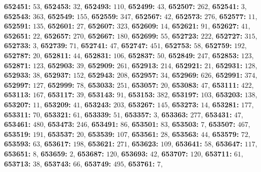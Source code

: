 \textsf{\bfseries 652451:} $53$, \textsf{\bfseries 652453:} $32$, \textsf{\bfseries 652493:} $110$, \textsf{\bfseries 652499:} $43$, \textsf{\bfseries 652507:} $262$, \textsf{\bfseries 652541:} $3$, \textsf{\bfseries 652543:} $363$, \textsf{\bfseries 652549:} $155$, \textsf{\bfseries 652559:} $347$, \textsf{\bfseries 652567:} $42$, \textsf{\bfseries 652573:} $276$, \textsf{\bfseries 652577:} $11$, \textsf{\bfseries 652591:} $135$, \textsf{\bfseries 652601:} $27$, \textsf{\bfseries 652607:} $323$, \textsf{\bfseries 652609:} $14$, \textsf{\bfseries 652621:} $91$, \textsf{\bfseries 652627:} $41$, \textsf{\bfseries 652651:} $22$, \textsf{\bfseries 652657:} $270$, \textsf{\bfseries 652667:} $180$, \textsf{\bfseries 652699:} $55$, \textsf{\bfseries 652723:} $222$, \textsf{\bfseries 652727:} $315$, \textsf{\bfseries 652733:} $3$, \textsf{\bfseries 652739:} $71$, \textsf{\bfseries 652741:} $47$, \textsf{\bfseries 652747:} $451$, \textsf{\bfseries 652753:} $58$, \textsf{\bfseries 652759:} $192$, \textsf{\bfseries 652787:} $20$, \textsf{\bfseries 652811:} $44$, \textsf{\bfseries 652831:} $106$, \textsf{\bfseries 652837:} $50$, \textsf{\bfseries 652849:} $247$, \textsf{\bfseries 652853:} $123$, \textsf{\bfseries 652871:} $123$, \textsf{\bfseries 652903:} $39$, \textsf{\bfseries 652909:} $261$, \textsf{\bfseries 652913:} $214$, \textsf{\bfseries 652921:} $21$, \textsf{\bfseries 652931:} $128$, \textsf{\bfseries 652933:} $38$, \textsf{\bfseries 652937:} $152$, \textsf{\bfseries 652943:} $208$, \textsf{\bfseries 652957:} $34$, \textsf{\bfseries 652969:} $626$, \textsf{\bfseries 652991:} $374$, \textsf{\bfseries 652997:} $127$, \textsf{\bfseries 652999:} $78$, \textsf{\bfseries 653033:} $251$, \textsf{\bfseries 653057:} $20$, \textsf{\bfseries 653083:} $47$, \textsf{\bfseries 653111:} $422$, \textsf{\bfseries 653113:} $167$, \textsf{\bfseries 653117:} $39$, \textsf{\bfseries 653143:} $91$, \textsf{\bfseries 653153:} $382$, \textsf{\bfseries 653197:} $103$, \textsf{\bfseries 653203:} $138$, \textsf{\bfseries 653207:} $11$, \textsf{\bfseries 653209:} $41$, \textsf{\bfseries 653243:} $203$, \textsf{\bfseries 653267:} $145$, \textsf{\bfseries 653273:} $14$, \textsf{\bfseries 653281:} $177$, \textsf{\bfseries 653311:} $70$, \textsf{\bfseries 653321:} $61$, \textsf{\bfseries 653339:} $51$, \textsf{\bfseries 653357:} $3$, \textsf{\bfseries 653363:} $277$, \textsf{\bfseries 653431:} $47$, \textsf{\bfseries 653461:} $480$, \textsf{\bfseries 653473:} $246$, \textsf{\bfseries 653491:} $86$, \textsf{\bfseries 653501:} $83$, \textsf{\bfseries 653503:} $7$, \textsf{\bfseries 653507:} $467$, \textsf{\bfseries 653519:} $191$, \textsf{\bfseries 653537:} $20$, \textsf{\bfseries 653539:} $107$, \textsf{\bfseries 653561:} $28$, \textsf{\bfseries 653563:} $44$, \textsf{\bfseries 653579:} $72$, \textsf{\bfseries 653593:} $63$, \textsf{\bfseries 653617:} $198$, \textsf{\bfseries 653621:} $271$, \textsf{\bfseries 653623:} $109$, \textsf{\bfseries 653641:} $58$, \textsf{\bfseries 653647:} $117$, \textsf{\bfseries 653651:} $8$, \textsf{\bfseries 653659:} $2$, \textsf{\bfseries 653687:} $120$, \textsf{\bfseries 653693:} $42$, \textsf{\bfseries 653707:} $120$, \textsf{\bfseries 653711:} $61$, \textsf{\bfseries 653713:} $38$, \textsf{\bfseries 653743:} $66$, \textsf{\bfseries 653749:} $495$, \textsf{\bfseries 653761:} $7$, 
